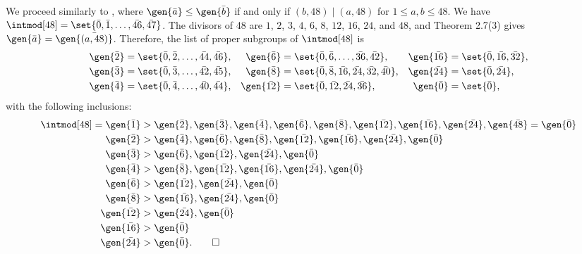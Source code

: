 \begin{sol}
    We proceed similarly to , where $\gen{\bar a} \leq \gen{\bar b}$ if and only if $(b, 48) \mid (a, 48)$ for $1 \leq a, b \leq 48$.
    We have $\intmod[48] = \set{\bar 0, \bar 1, \ldots, \bar{46}, \bar{47}}$.
    The divisors of 48 are $1$, $2$, $3$, $4$, $6$, $8$, $12$, $16$, $24$, and $48$, and Theorem 2.7(3) gives $\gen{\bar a} = \gen{\bar{(a, 48)}}$.
    Therefore, the list of proper subgroups of $\intmod[48]$ is
    \begin{align*}
        \gen{\bar 2} &= \set{\bar 0, \bar 2, \ldots, \bar{44}, \bar{46}}, & 
        \gen{\bar 6} &= \set{\bar 0, \bar 6, \ldots, \bar{36}, \bar{42}}, & 
        \gen{\bar{16}} &= \set{\bar 0, \bar{16}, \bar{32}}, \\
        \gen{\bar 3} &= \set{\bar 0, \bar 3, \ldots, \bar{42}, \bar{45}}, & 
        \gen{\bar 8} &= \set{\bar 0, \bar 8, \bar{16}, \bar{24}, \bar{32}, \bar{40}}, & 
        \gen{\bar{24}} &= \set{\bar 0, \bar{24}}, \\
        \gen{\bar 4} &= \set{\bar 0, \bar 4, \ldots, \bar{40}, \bar{44}}, & 
        \gen{\bar{12}} &= \set{\bar 0, \bar{12}, \bar{24}, \bar{36}}, & 
        \gen{\bar{0}} &= \set{\bar 0},
    \end{align*}
    with the following inclusions:
    \begin{align*}
        \intmod[48] = \gen{\bar 1} &> \gen{\bar 2}, \gen{\bar 3}, \gen{\bar 4}, \gen{\bar 6}, \gen{\bar 8}, \gen{\bar{12}}, \gen{\bar{16}}, \gen{\bar{24}}, \gen{\bar{48}} = \gen{\bar 0} \\
        \gen{\bar 2} &> \gen{\bar 4}, \gen{\bar 6}, \gen{\bar 8}, \gen{\bar{12}}, \gen{\bar{16}}, \gen{\bar{24}}, \gen{\bar 0} \\
        \gen{\bar 3} &> \gen{\bar 6}, \gen{\bar{12}}, \gen{\bar{24}}, \gen{\bar 0} \\
        \gen{\bar 4} &> \gen{\bar 8}, \gen{\bar{12}}, \gen{\bar{16}}, \gen{\bar{24}}, \gen{\bar 0} \\
        \gen{\bar 6} &> \gen{\bar{12}}, \gen{\bar{24}}, \gen{\bar 0} \\
        \gen{\bar 8} &> \gen{\bar{16}}, \gen{\bar{24}}, \gen{\bar 0} \\
        \gen{\bar{12}} &> \gen{\bar{24}}, \gen{\bar 0} \\
        \gen{\bar{16}} &> \gen{\bar 0} \\
        \gen{\bar{24}} &> \gen{\bar 0}. \qedhere
    \end{align*}
\end{sol}

